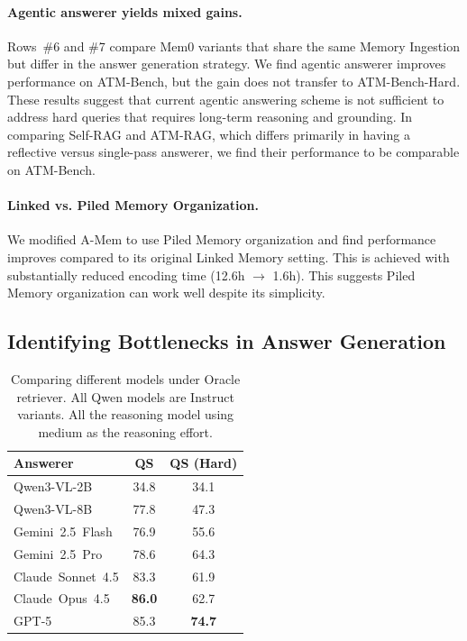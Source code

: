 \documentclass{article}
\theoremstyle{plain}
\theoremstyle{definition}
\theoremstyle{remark}
\begin{document}
\paragraph{Agentic answerer yields mixed gains.}
Rows~\#6 and \#7 compare Mem0 variants that share the same Memory Ingestion but differ in the answer generation strategy. We find agentic answerer improves performance on ATM-Bench, but the gain does not transfer to ATM-Bench-Hard. 
These results suggest that current agentic answering scheme is not sufficient to address hard queries that requires long-term reasoning and grounding. In comparing Self-RAG and ATM-RAG, which differs primarily in having a reflective versus single-pass answerer, we find their performance to be comparable on ATM-Bench. 


\paragraph{Linked vs. Piled Memory Organization.} We modified A-Mem to use Piled Memory organization and find performance improves compared to its original Linked Memory setting. This is achieved with substantially reduced encoding time (12.6h $\rightarrow$ 1.6h). This suggests Piled Memory organization can work well despite its simplicity.


\subsection{Identifying Bottlenecks in Answer Generation}

\begin{table}[htb]
\centering
\small
\setlength{\tabcolsep}{6pt}
\caption{Comparing different models under Oracle retriever. All Qwen models are Instruct variants. All the reasoning model using medium as the reasoning effort.}
\label{tab:oracle_reasoning}
\begin{tabular}{l cc}
\toprule
\textbf{Answerer} & \textbf{QS} & \textbf{QS (Hard)} \\
\midrule
Qwen3-VL-2B         & 34.8 & 34.1 \\
Qwen3-VL-8B          & 77.8 & 47.3 \\
Gemini~2.5~Flash     & 76.9 & 55.6 \\
Gemini~2.5~Pro       & 78.6 & 64.3 \\
Claude~Sonnet~4.5    & 83.3 & 61.9 \\
Claude~Opus~4.5      & \textbf{86.0} & 62.7 \\
GPT-5                & 85.3 & \textbf{74.7} \\
\bottomrule
\end{tabular}
\end{table}
\end{document}
